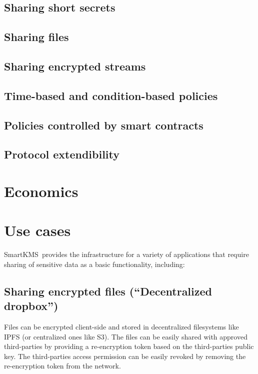 \documentclass[notitlepage,longbibliography]{revtex4-1}
\newcommand{\kms}{SmartKMS}
\begin{document}
\subsection{Sharing short secrets}

\subsection{Sharing files}

\subsection{Sharing encrypted streams}

\subsection{Time-based and condition-based policies}

\subsection{Policies controlled by smart contracts}

\subsection{Protocol extendibility}

\section{Economics}

\section{Use cases}
\kms~provides the infrastructure for a variety of applications that require sharing of sensitive data as a basic
functionality, including:

\subsection{Sharing encrypted files (``Decentralized dropbox'')}
Files can be encrypted client-side and stored in decentralized filesystems like IPFS (or centralized ones like S3).
The files can be easily shared with approved third-parties by providing a re-encryption token based on the third-parties
public key.
The third-parties access permission can be easily revoked by removing the re-encryption token from the network.
\end{document}
